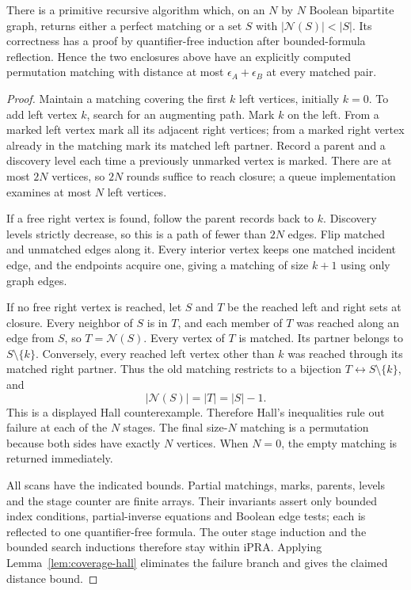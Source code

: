 \begin{theorem}
\label{thm:bounded-matching}
There is a primitive recursive algorithm which, on an $N$ by $N$ Boolean
bipartite graph, returns either a perfect matching or a set $S$ with
$|\mathcal N(S)|<|S|$.  Its correctness has a proof by quantifier-free
induction after bounded-formula reflection.  Hence the two enclosures above
have an explicitly computed permutation matching with distance at most
$\epsilon_A+\epsilon_B$ at every matched pair.
\end{theorem}
\begin{proof}
Maintain a matching covering the first $k$ left vertices, initially $k=0$.
To add left vertex $k$, search for an augmenting path.  Mark $k$ on the left.
From a marked left vertex mark all its adjacent right vertices; from a marked
right vertex already in the matching mark its matched left partner.  Record
a parent and a discovery level each time a previously unmarked vertex is
marked.  There are at most $2N$ vertices, so $2N$ rounds suffice to reach
closure; a queue implementation examines at most $N$ left vertices.

If a free right vertex is found, follow the parent records back to $k$.
Discovery levels strictly decrease, so this is a path of fewer than $2N$
edges.  Flip matched and unmatched edges along it.  Every interior vertex
keeps one matched incident edge, and the endpoints acquire one, giving a
matching of size $k+1$ using only graph edges.

If no free right vertex is reached, let $S$ and $T$ be the reached left and
right sets at closure.  Every neighbor of $S$ is in $T$, and each member of
$T$ was reached along an edge from $S$, so $T=\mathcal N(S)$.  Every vertex
of $T$ is matched.  Its partner belongs to $S\setminus\{k\}$.  Conversely,
every reached left vertex other than $k$ was reached through its matched
right partner.  Thus the old matching restricts to a bijection
$T\leftrightarrow S\setminus\{k\}$, and
\[
              |\mathcal N(S)|=|T|=|S|-1.
\]
This is a displayed Hall counterexample.  Therefore Hall's inequalities rule
out failure at each of the $N$ stages.  The final size-$N$ matching is a
permutation because both sides have exactly $N$ vertices.  When $N=0$, the
empty matching is returned immediately.

All scans have the indicated bounds.  Partial matchings, marks, parents,
levels and the stage counter are finite arrays.  Their invariants assert
only bounded index conditions, partial-inverse equations and Boolean edge
tests; each is reflected to one quantifier-free formula.  The outer stage
induction and the bounded search inductions therefore stay within iPRA.
Applying Lemma~\ref{lem:coverage-hall} eliminates the failure branch and gives
the claimed distance bound.
\end{proof}

